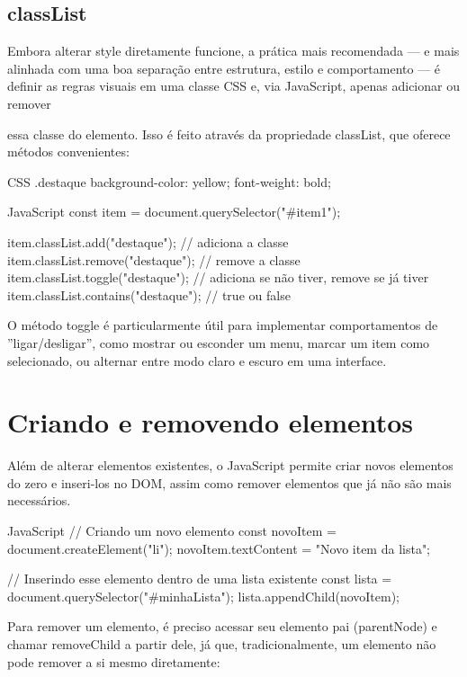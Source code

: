 \subsection{classList}

Embora alterar style diretamente funcione, a prática mais recomendada — e mais alinhada com uma boa separação entre estrutura, estilo e comportamento — é definir as regras visuais em uma classe CSS e, via JavaScript, apenas adicionar ou remover

essa classe do elemento. Isso é feito através da propriedade classList, que oferece métodos convenientes:

\begin{codebox}{CSS}
.destaque {
  background-color: yellow;
  font-weight: bold;
}
\end{codebox}

\begin{codebox}{JavaScript}
const item = document.querySelector("#item1");

item.classList.add("destaque");     // adiciona a classe
item.classList.remove("destaque"); // remove a classe
item.classList.toggle("destaque"); // adiciona se não tiver, remove se já tiver
item.classList.contains("destaque"); // true ou false
\end{codebox}

O método toggle é particularmente útil para implementar comportamentos de ”ligar/desligar”, como mostrar ou esconder um menu, marcar um item como selecionado, ou alternar entre modo claro e escuro em uma interface.

\section{Criando e removendo elementos}

Além de alterar elementos existentes, o JavaScript permite criar novos elementos do zero e inseri-los no DOM, assim como remover elementos que já não são mais necessários.

\begin{codebox}{JavaScript}
// Criando um novo elemento
const novoItem = document.createElement("li");
novoItem.textContent = "Novo item da lista";

// Inserindo esse elemento dentro de uma lista existente
const lista = document.querySelector("#minhaLista");
lista.appendChild(novoItem);
\end{codebox}

Para remover um elemento, é preciso acessar seu elemento pai (parentNode) e chamar removeChild a partir dele, já que, tradicionalmente, um elemento não pode remover a si mesmo diretamente:

